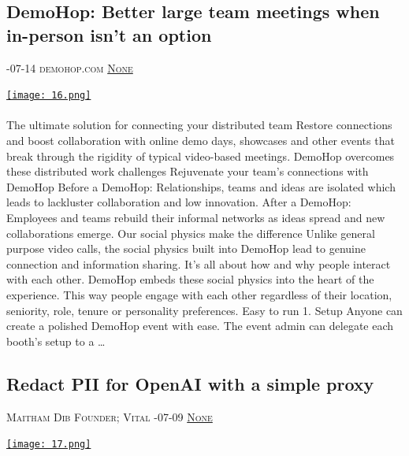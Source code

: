 \documentclass[10pt,a4paper]{article}
\begin{document}
\begin{multicols}{2}
\raggedcolumns
\noindent\begin{minipage}{\linewidth}
\medskip
\subsection{DemoHop: Better large team meetings when in-person isn't an option}
\textsc{\footnotesize
{\scriptsize\faCalendar}-07-14 
{\scriptsize\faGlobe}\space 
demohop.com 
{\scriptsize\faComments}\space 
\href{}{None} 
}
\par\medskip\noindent
\href{https://demohop.com}{
    \texttt{[image: 16.png]}
}
\end{minipage}
\paragraph{}
The ultimate solution for connecting your distributed team
Restore connections and boost collaboration with online demo days, showcases and other events that break through the rigidity of typical video-based meetings.
DemoHop overcomes these distributed work challenges
Rejuvenate your team's connections with DemoHop
Before a DemoHop: Relationships, teams and ideas are isolated which leads to lackluster collaboration and low innovation.
After a DemoHop: Employees and teams rebuild their informal networks as ideas spread and new collaborations emerge.
Our social physics make the difference
Unlike general purpose video calls, the social physics built into DemoHop lead to genuine connection and information sharing.
It’s all about how and why people interact with each other. DemoHop embeds these social physics into the heart of the experience. This way people engage with each other regardless of their location, seniority, role, tenure or personality preferences.
Easy to run
1. Setup
Anyone can create a polished DemoHop event with ease. The event admin can delegate each booth's setup to a 
\dots\par
\noindent\begin{minipage}{\linewidth}
\medskip
\subsection{Redact PII for OpenAI with a simple proxy}
\textsc{\footnotesize
{\scriptsize\faUser}\space 
Maitham Dib Founder; Vital 
{\scriptsize\faCalendar}-07-09 
{\scriptsize\faComments}\space 
\href{}{None} 
}
\par\medskip\noindent
\href{https://evervault.com/use-cases/ai-privacy?utm\_source=newsletter\&utm\_medium=email\&utm\_campaign=hackernewsletter}{
    \texttt{[image: 17.png]}
}
\end{minipage}

\end{multicols}
\end{document}
